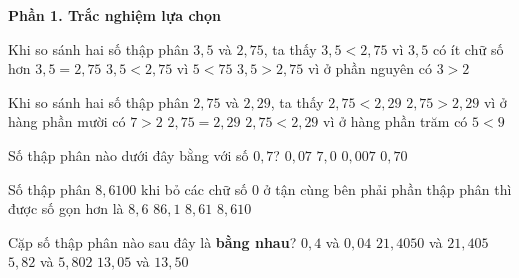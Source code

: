 \textbf{Phần 1. Trắc nghiệm lựa chọn}

\begin{ex} %
Khi so sánh hai số thập phân $3{,}5$ và $2{,}75$, ta thấy
\choice
{$3{,}5 < 2{,}75$ vì $3{,}5$ có ít chữ số hơn}
{$3{,}5 = 2{,}75$}
{$3{,}5 < 2{,}75$ vì $5 < 75$}
{\True $3{,}5 > 2{,}75$ vì ở phần nguyên có $3 > 2$}
\end{ex}

\begin{ex} %
Khi so sánh hai số thập phân $2{,}75$ và $2{,}29$, ta thấy
\choice
{$2{,}75 < 2{,}29$}
{\True $2{,}75 > 2{,}29$ vì ở hàng phần mười có $7 > 2$}
{$2{,}75 = 2{,}29$}
{$2{,}75 < 2{,}29$ vì ở hàng phần trăm có $5 < 9$}
\end{ex}

\begin{ex} %
Số thập phân nào dưới đây bằng với số $0{,}7$?
\choice
{$0{,}07$}
{$7{,}0$}
{$0{,}007$}
{\True $0{,}70$}
\end{ex}

\begin{ex} %
Số thập phân $8{,}6100$ khi bỏ các chữ số $0$ ở tận cùng bên phải phần thập phân thì được số gọn hơn là
\choice
{$8{,}6$}
{$86{,}1$}
{\True $8{,}61$}
{$8{,}610$}
\end{ex}

\begin{ex} %
Cặp số thập phân nào sau đây là \textbf{bằng nhau}?
\choice
{$0{,}4$ và $0{,}04$}
{\True $21{,}4050$ và $21{,}405$}
{$5{,}82$ và $5{,}802$}
{$13{,}05$ và $13{,}50$}
\end{ex}

